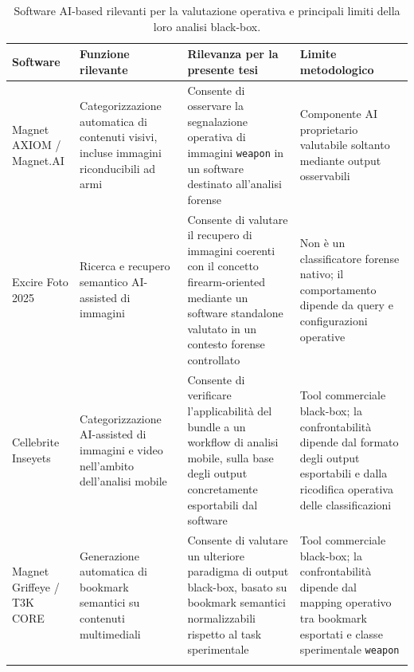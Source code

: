 \begin{table}[htbp]
    \centering
    \small
    \renewcommand{\arraystretch}{1.25}
    \begin{tabularx}{\textwidth}{@{}p{2.8cm}p{3.5cm}X p{3.2cm}@{}}
        \toprule
        \textbf{Software} &
        \textbf{Funzione rilevante} &
        \textbf{Rilevanza per la presente tesi} &
        \textbf{Limite metodologico} \\
        \midrule
        Magnet AXIOM / Magnet.AI &
        Categorizzazione automatica di contenuti visivi, incluse immagini riconducibili ad armi &
        Consente di osservare la segnalazione operativa di immagini \texttt{weapon} in un software destinato all'analisi forense &
        Componente AI proprietario valutabile soltanto mediante output osservabili \\
        \addlinespace
        Excire Foto 2025 &
        Ricerca e recupero semantico AI-assisted di immagini &
        Consente di valutare il recupero di immagini coerenti con il concetto firearm-oriented mediante un software standalone valutato in un contesto forense controllato &
        Non è un classificatore forense nativo; il comportamento dipende da query e configurazioni operative \\
        \addlinespace

        Cellebrite Inseyets &
        Categorizzazione AI-assisted di immagini e video nell'ambito dell'analisi mobile &
        Consente di verificare l'applicabilità del bundle a un workflow di analisi mobile, sulla base degli output concretamente esportabili dal software &
        Tool commerciale black-box; la confrontabilità dipende dal formato degli output esportabili e dalla ricodifica operativa delle classificazioni  \\
        \addlinespace

        Magnet Griffeye / T3K CORE &
        Generazione automatica di bookmark semantici su contenuti multimediali &
        Consente di valutare un ulteriore paradigma di output black-box, basato
        su bookmark semantici normalizzabili rispetto al task sperimentale &
        Tool commerciale black-box; la confrontabilità dipende dal mapping
        operativo tra bookmark esportati e classe sperimentale \texttt{weapon} \\
        \addlinespace


        \bottomrule
    \end{tabularx}
    \caption{Software AI-based rilevanti per la valutazione operativa e principali limiti della loro analisi black-box.}
    \label{tab:sota_ai_based_software}
\end{table}


